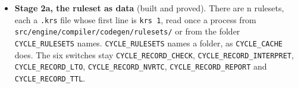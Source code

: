 \begin{enumerate}
\begin{itemize}
\begin{enumerate}
\begin{itemize}
\item \textbf{Stage 2a, the ruleset as data} (built and proved). There are n rulesets, each a \texttt{.\allowbreak{}krs} file whose first line is \texttt{krs 1}, read once a process from \texttt{src/\allowbreak{}engine/\allowbreak{}compiler/\allowbreak{}codegen/\allowbreak{}rulesets/\allowbreak{}} or from the folder \texttt{CYCLE\_\allowbreak{}RULESETS} names. \texttt{CYCLE\_\allowbreak{}RULESETS} names a folder, as \texttt{CYCLE\_\allowbreak{}CACHE} does. The six switches stay \texttt{CYCLE\_\allowbreak{}RECORD\_\allowbreak{}CHECK}, \texttt{CYCLE\_\allowbreak{}RECORD\_\allowbreak{}INTERPRET}, \texttt{CYCLE\_\allowbreak{}RECORD\_\allowbreak{}LTO}, \texttt{CYCLE\_\allowbreak{}RECORD\_\allowbreak{}NVRTC}, \texttt{CYCLE\_\allowbreak{}RECORD\_\allowbreak{}REPORT} and \texttt{CYCLE\_\allowbreak{}RECORD\_\allowbreak{}TTL}.


\end{itemize}
\end{enumerate}
\end{itemize}
\end{enumerate}
